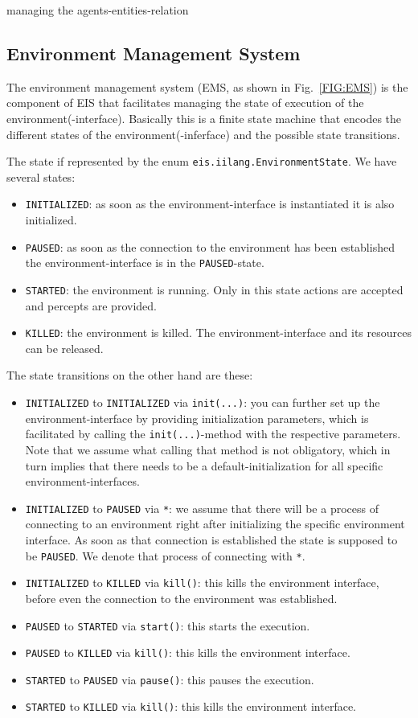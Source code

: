 \documentclass[a4]{article}
\newcommand{\EIS}{\textsf{EIS}\xspace}
\begin{document}
managing the agents-entities-relation

\subsection{Environment Management System}

The environment management system (EMS, as shown in Fig.~\ref{FIG:EMS}) is the component of \EIS that facilitates managing the
state of execution of the environment(-interface). Basically this is a finite state machine that encodes the different
states of the environment(-inferface) and the possible state transitions.

The state if represented by the enum \texttt{eis.iilang.EnvironmentState}.
We have several states:
\begin{itemize}
\item\texttt{INITIALIZED}: 
as soon as the environment-interface is instantiated it is also initialized. 
\item\texttt{PAUSED}: as soon as the connection to the environment has been
established the environment-interface is in the \texttt{PAUSED}-state.
\item\texttt{STARTED}: the environment is running. Only in this state actions are accepted and 
percepts are provided. 
\item\texttt{KILLED}: the environment is killed. The environment-interface  and its resources can be released.
\end{itemize}

The state transitions on the other hand are these:
\begin{itemize}
\item \texttt{INITIALIZED} to \texttt{INITIALIZED} via \texttt{init(...)}: you can further set up the environment-interface by providing initialization parameters, which is facilitated by calling the \texttt{init(...)}-method with the respective parameters. Note that we assume what calling that method is not obligatory, which in turn implies that there needs to
be a default-initialization for all specific environment-interfaces.
\item \texttt{INITIALIZED} to \texttt{PAUSED} via \texttt{*}: we assume that there will be a process of connecting
to an environment right after initializing the specific environment interface. As soon as that connection is established
the state is supposed to be \texttt{PAUSED}. We denote that process of connecting with \texttt{*}.
\item \texttt{INITIALIZED} to \texttt{KILLED} via \texttt{kill()}: this kills the environment interface, before even the
connection to the environment was established.
\item \texttt{PAUSED} to \texttt{STARTED} via \texttt{start()}: this starts the execution.
\item \texttt{PAUSED} to \texttt{KILLED} via \texttt{kill()}: this kills the environment interface.
\item \texttt{STARTED} to \texttt{PAUSED} via \texttt{pause()}: this pauses the execution.
\item \texttt{STARTED} to \texttt{KILLED} via \texttt{kill()}: this kills the environment interface.
\end{itemize}
\end{document}
